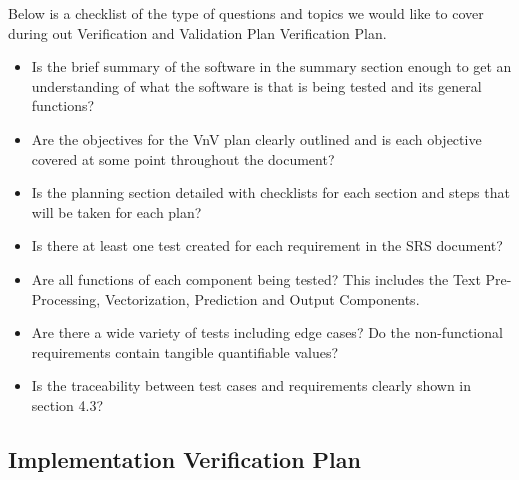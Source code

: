 \documentclass[12pt, titlepage]{article}
\begin{document}
  Below is a checklist of the type of questions and topics we would like to cover during out Verification and Validation Plan Verification Plan.\\
  
  \begin{itemize}
  
  \item Is the brief summary of the software in the summary section enough to get an understanding of what the software is that is being tested and its general functions?
  \item Are the objectives for the VnV plan clearly outlined and is each objective covered at some point throughout the document?
  \item Is the planning section detailed with checklists for each section and steps that will be taken for each plan?
  \item Is there at least one test created for each requirement in the SRS document?
  \item Are all functions of each component being tested? This includes the Text Pre-Processing, Vectorization, Prediction and Output Components.
  \item Are there a wide variety of tests including edge cases?
  Do the non-functional requirements contain tangible quantifiable values?
  \item Is the traceability between test cases and requirements clearly shown in section 4.3?
  \end{itemize}
  
  
  \subsection{Implementation Verification Plan}
  
\end{document}
